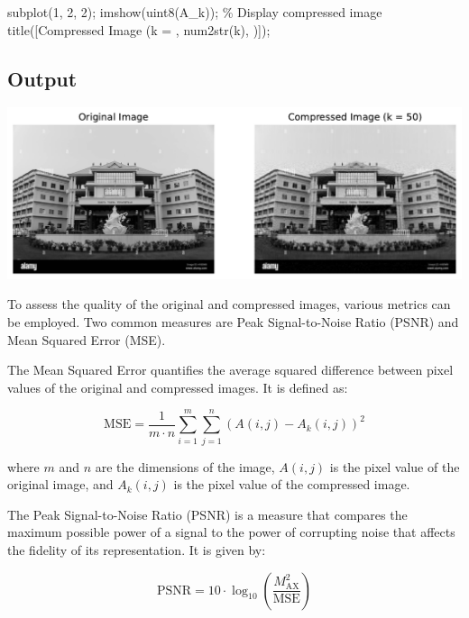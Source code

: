 \documentclass[
  journal,
]{IEEEtran}%
\newenvironment{Shaded}{\begin{snugshade}}{\end{snugshade}}
\newcommand{\CommentTok}[1]{\textcolor[rgb]{0.37,0.37,0.37}{#1}}
\newcommand{\FloatTok}[1]{\textcolor[rgb]{0.68,0.00,0.00}{#1}}
\newcommand{\NormalTok}[1]{\textcolor[rgb]{0.00,0.23,0.31}{#1}}
\newcommand{\OperatorTok}[1]{\textcolor[rgb]{0.37,0.37,0.37}{#1}}
\newcommand{\SpecialStringTok}[1]{\textcolor[rgb]{0.13,0.47,0.30}{#1}}
\newcommand{\VariableTok}[1]{\textcolor[rgb]{0.07,0.07,0.07}{#1}}
\begin{document}
\begin{Shaded}
\begin{Highlighting}[]
\VariableTok{subplot}\NormalTok{(}\FloatTok{1}\OperatorTok{,} \FloatTok{2}\OperatorTok{,} \FloatTok{2}\NormalTok{)}\OperatorTok{;}
\VariableTok{imshow}\NormalTok{(}\VariableTok{uint8}\NormalTok{(}\VariableTok{A\_k}\NormalTok{))}\OperatorTok{;} \CommentTok{\% Display compressed image}
\VariableTok{title}\NormalTok{([}\SpecialStringTok{\textquotesingle{}Compressed Image (k = \textquotesingle{}}\OperatorTok{,} \VariableTok{num2str}\NormalTok{(}\VariableTok{k}\NormalTok{)}\OperatorTok{,} \SpecialStringTok{\textquotesingle{})\textquotesingle{}}\NormalTok{])}\OperatorTok{;}
\end{Highlighting}
\end{Shaded}

\subsection{Output}

\includegraphics{index_files/figure-pdf/cell-2-output-1.pdf}

To assess the quality of the original and compressed images, various
metrics can be employed. Two common measures are Peak Signal-to-Noise
Ratio (PSNR) and Mean Squared Error (MSE).

The Mean Squared Error quantifies the average squared difference between
pixel values of the original and compressed images. It is defined as:

\[
\text{MSE} = \frac{1}{m \cdot n} \sum_{i=1}^{m} \sum_{j=1}^{n} (A(i,j) - A_k(i,j))^2
\]

where \(m\) and \(n\) are the dimensions of the image, \(A(i,j)\) is the
pixel value of the original image, and \(A_k(i,j)\) is the pixel value
of the compressed image.

The Peak Signal-to-Noise Ratio (PSNR) is a measure that compares the
maximum possible power of a signal to the power of corrupting noise that
affects the fidelity of its representation. It is given by:

\[
\text{PSNR} = 10 \cdot \log_{10}\left(\frac{M_{\text{AX}}^2}{\text{MSE}}\right)
\]
\end{document}
